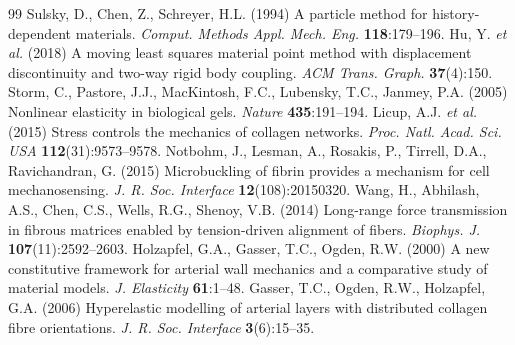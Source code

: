 \documentclass[10pt,a4paper]{article}
\begin{document}
{\small
\begin{thebibliography}{99}\setlength{\itemsep}{0pt}
 Sulsky, D., Chen, Z., Schreyer, H.L. (1994) A particle method for history-dependent
materials. \emph{Comput. Methods Appl. Mech. Eng.} \textbf{118}:179--196.
 Hu, Y. \emph{et al.} (2018) A moving least squares material point method with
displacement discontinuity and two-way rigid body coupling. \emph{ACM Trans. Graph.} \textbf{37}(4):150.
 Storm, C., Pastore, J.J., MacKintosh, F.C., Lubensky, T.C., Janmey, P.A. (2005)
Nonlinear elasticity in biological gels. \emph{Nature} \textbf{435}:191--194.
 Licup, A.J. \emph{et al.} (2015) Stress controls the mechanics of collagen networks.
\emph{Proc. Natl. Acad. Sci. USA} \textbf{112}(31):9573--9578.
 Notbohm, J., Lesman, A., Rosakis, P., Tirrell, D.A., Ravichandran, G. (2015)
Microbuckling of fibrin provides a mechanism for cell mechanosensing. \emph{J. R. Soc. Interface}
\textbf{12}(108):20150320.
 Wang, H., Abhilash, A.S., Chen, C.S., Wells, R.G., Shenoy, V.B. (2014) Long-range
force transmission in fibrous matrices enabled by tension-driven alignment of fibers.
\emph{Biophys. J.} \textbf{107}(11):2592--2603.
 Holzapfel, G.A., Gasser, T.C., Ogden, R.W. (2000) A new constitutive framework for
arterial wall mechanics and a comparative study of material models. \emph{J. Elasticity} \textbf{61}:1--48.
 Gasser, T.C., Ogden, R.W., Holzapfel, G.A. (2006) Hyperelastic modelling of arterial
layers with distributed collagen fibre orientations. \emph{J. R. Soc. Interface} \textbf{3}(6):15--35.
\end{thebibliography}}
\end{document}
